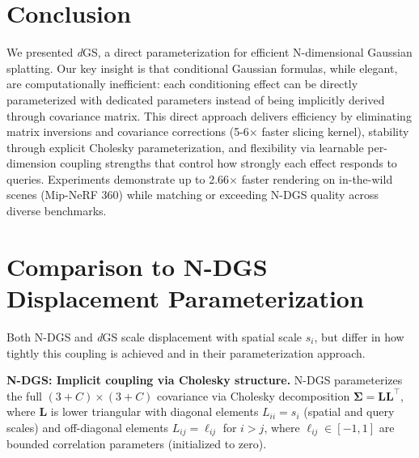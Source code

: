 \documentclass{article}
\newcommand{\modelname}{\textit{d}GS}
\theoremstyle{plain}
\theoremstyle{definition}
\theoremstyle{remark}
\begin{document}
\section{Conclusion}

We presented \modelname{}, a direct parameterization for efficient N-dimensional Gaussian splatting. Our key insight is that conditional Gaussian formulas, while elegant, are computationally inefficient: each conditioning effect can be directly parameterized with dedicated parameters instead of being implicitly derived through covariance matrix. This direct approach delivers efficiency by eliminating matrix inversions and covariance corrections (5-6$\times$ faster slicing kernel), stability through explicit Cholesky parameterization, and flexibility via learnable per-dimension coupling strengths that control how strongly each effect responds to queries. Experiments demonstrate up to 2.66$\times$ faster rendering on in-the-wild scenes (Mip-NeRF 360) while matching or exceeding N-DGS quality across diverse benchmarks.




\newpage
\appendix
\onecolumn
\section{Comparison to N-DGS Displacement Parameterization}
\label{sec:spatial_scaling_proof}

Both N-DGS \cite{gao20246dgs, gao20257dgs} and \modelname{} scale displacement with spatial scale $s_i$, but differ in how tightly this coupling is achieved and in their parameterization approach.

\textbf{N-DGS: Implicit coupling via Cholesky structure.} N-DGS parameterizes the full $(3+C) \times (3+C)$ covariance via Cholesky decomposition $\boldsymbol{\Sigma} = \mathbf{L}\mathbf{L}^\top$, where $\mathbf{L}$ is lower triangular with diagonal elements $L_{ii} = s_i$ (spatial and query scales) and off-diagonal elements $L_{ij} = \ell_{ij}$ for $i > j$, where $\ell_{ij} \in [-1,1]$ are bounded correlation parameters (initialized to zero).
\end{document}
